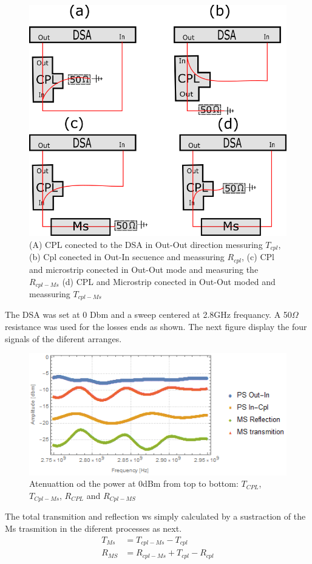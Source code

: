 \begin{figure}
	\centering
	\includegraphics[width=0.7\linewidth]{../figures/APD}
	\caption[diferent arranges of the CPL and MicroStrip conected to the DSA]{(A) CPL conected to the DSA in Out-Out direction messuring $T_{cpl}$, (b) Cpl conected in Out-In secuence and meassuring $R_{cpl}$, (c) CPl and microstrip conected in Out-Out mode and measuring the $R_{cpl-Ms}$ (d) CPL and Microstrip conected in Out-Out moded and meassuring $T_{cpl-Ms}$}
	\label{fig:apd}
\end{figure}

The DSA was set at 0 Dbm and a sweep centered at 2.8GHz frequancy. A 50$\Omega$ resistance was used for the losses ends as shown. The next figure display the four signals of the diferent arranges.
\begin{figure}
	\centering
	\includegraphics[width=0.7\linewidth]{../figures/microstrip}
	\caption{Atenuattion od the power at 0dBm from top to bottom: $T_{CPL}$,$T_{Cpl-Ms}$, $R_{CPL}$ and $R_{Cpl-MS}$}
	\label{fig:microstrip}
	\end{figure}

The total transmition and reflection ws simply calculated by a sustraction of the Ms trasmition in the diferent processes as next.
\begin{align}
T_{Ms}&=T_{cpl-Ms}-T_{cpl}\\
R_{MS}&=R_{cpl-Ms}+T_{cpl}-R_{cpl}
\end{align}

